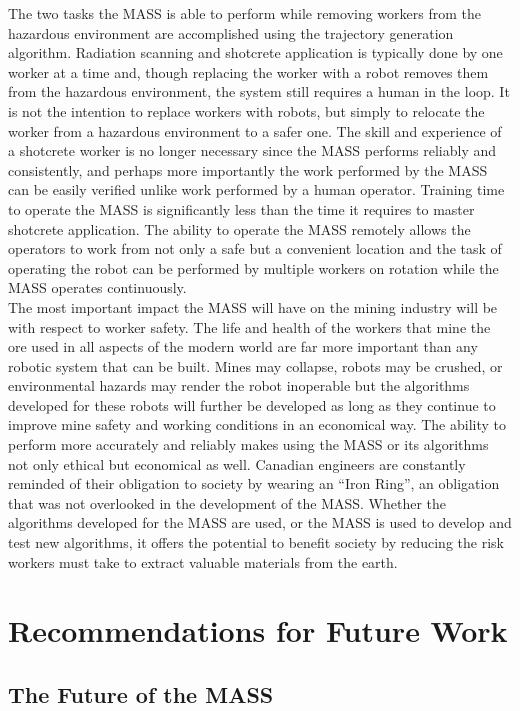 The two tasks the MASS is able to perform while removing workers from the hazardous environment are accomplished using the trajectory generation algorithm. Radiation scanning and shotcrete application is typically done by one worker at a time and, though replacing the worker with a robot removes them from the hazardous environment, the system still requires a human in the loop. It is not the intention to replace workers with robots, but simply to relocate the worker from a hazardous environment to a safer one. The skill and experience of a shotcrete worker is no longer necessary since the MASS performs reliably and consistently, and perhaps more importantly the work performed by the MASS can be easily verified unlike work performed by a human operator. Training time to operate the MASS is significantly less than the time it requires to master shotcrete application. The ability to operate the MASS remotely allows the operators to work from not only a safe but a convenient location and the task of operating the robot can be performed by multiple workers on rotation while the MASS operates continuously.\\

The most important impact the MASS will have on the mining industry will be with respect to worker safety. The life and health of the workers that mine the ore used in all aspects of the modern world are far more important than any robotic system that can be built. Mines may collapse, robots may be crushed, or environmental hazards may render the robot inoperable but the algorithms developed for these robots will further be developed as long as they continue to improve mine safety and working conditions in an economical way. The ability to perform more accurately and reliably makes using the MASS or its algorithms not only ethical but economical as well. Canadian engineers are constantly reminded of their obligation to society by wearing an ``Iron Ring'', an obligation that was not overlooked in the development of the MASS. Whether the algorithms developed for the MASS are used, or the MASS is used to develop and test new algorithms, it offers the potential to benefit society by reducing the risk workers must take to extract valuable materials from the earth.\\

\section{Recommendations for Future Work}
\subsection{The Future of the MASS}

